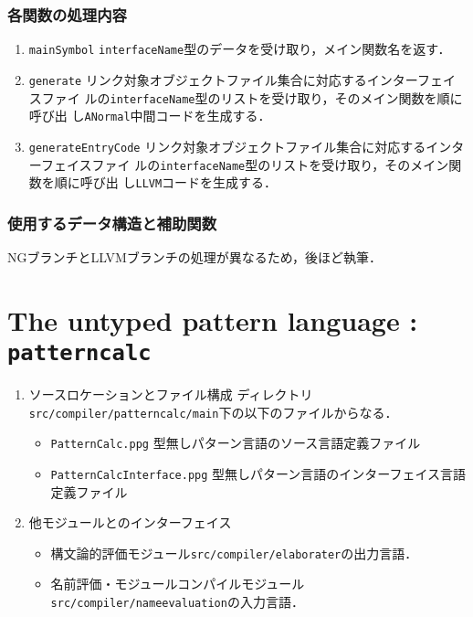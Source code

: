 \documentclass{jbook}
\newcommand{\txt}[2]{#2}
\newcommand{\code}[1]{\mbox{\large\tt #1}}
\begin{document}
\subsection{各関数の処理内容}
\begin{enumerate}
\item \code{mainSymbol}
	\code{interfaceName}型のデータを受け取り，メイン関数名を返す．
\item \code{generate}
リンク対象オブジェクトファイル集合に対応するインターフェイスファイ
ルの\code{interfaceName}型のリストを受け取り，そのメイン関数を順に呼び出
し\code{ANormal}中間コードを生成する．
\item \code{generateEntryCode}
リンク対象オブジェクトファイル集合に対応するインターフェイスファイ
ルの\code{interfaceName}型のリストを受け取り，そのメイン関数を順に呼び出
し\code{LLVM}コードを生成する．
\end{enumerate}

\subsection{使用するデータ構造と補助関数}

	NGブランチとLLVMブランチの処理が異なるため，後ほど執筆．

\else%
\fi%



% 
\chapter{\txt
{型無しパターン言語：\code{patterncalc}}
{The untyped pattern language : \code{patterncalc}}
}
\label{chap:PatternCalc}

\ifjp%
\begin{enumerate}
\item ソースロケーションとファイル構成
ディレクトリ \code{src/compiler/patterncalc/main}下の以下のファイルからなる．
\begin{itemize}
\item \code{PatternCalc.ppg} 型無しパターン言語のソース言語定義ファイル
\item \code{PatternCalcInterface.ppg} 型無しパターン言語のインターフェイス言語定義ファイル
\end{itemize}

\item 他モジュールとのインターフェイス
\begin{itemize}
\item 構文論的評価モジュール\code{src/compiler/elaborater}の出力言語．
\item 名前評価・モジュールコンパイルモジュール\code{src/compiler/nameevaluation}の入力言語．
\end{itemize}
\end{enumerate}
\else%
\fi%
\end{document}
